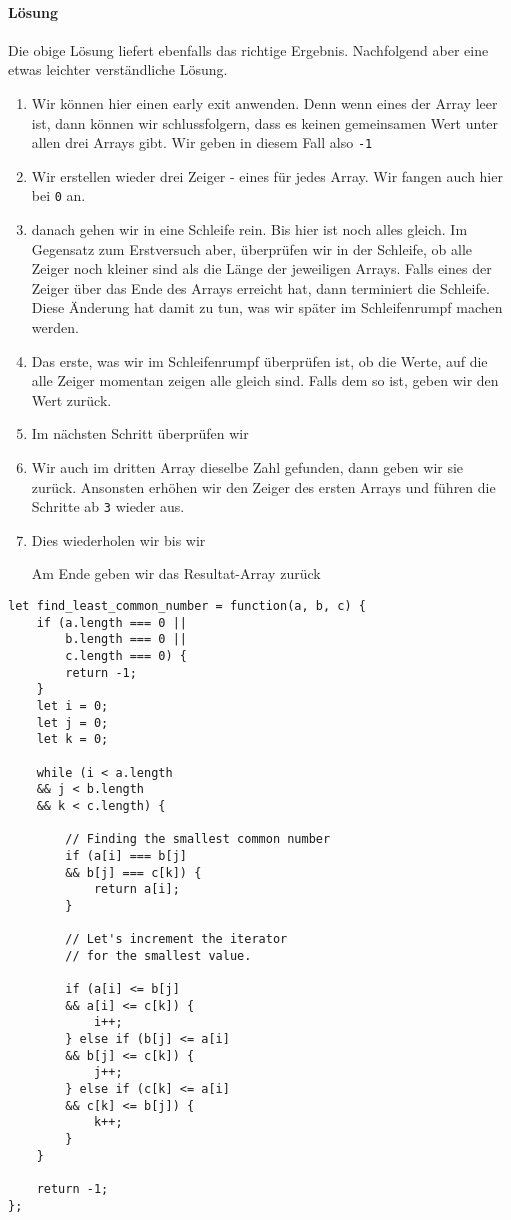 \documentclass[babel]{book}
\begin{document}
\paragraph{Lösung} Die obige Lösung liefert ebenfalls das richtige Ergebnis. Nachfolgend aber eine etwas leichter verständliche Lösung.
\begin{enumerate} 
	\item Wir können hier einen early exit anwenden. Denn wenn eines der Array leer ist, dann können wir schlussfolgern, dass es keinen gemeinsamen Wert unter allen drei Arrays gibt. Wir geben in diesem Fall also \lstinline|-1| 
	\item Wir erstellen wieder drei Zeiger - eines für jedes Array. Wir fangen auch hier bei \lstinline|0| an.
	\item danach gehen wir in eine Schleife rein. Bis hier ist noch alles gleich. Im Gegensatz zum Erstversuch aber, überprüfen wir in der Schleife, ob alle Zeiger noch kleiner sind als die Länge der jeweiligen Arrays. Falls eines der Zeiger über das Ende des Arrays erreicht hat, dann terminiert die Schleife. Diese Änderung hat damit zu tun, was wir später im Schleifenrumpf machen werden.
	\item Das erste, was wir im Schleifenrumpf überprüfen ist, ob die Werte, auf die alle Zeiger momentan zeigen alle gleich sind. Falls dem so ist, geben wir den Wert zurück. 
	\item Im nächsten Schritt überprüfen wir 
	\item Wir auch im dritten Array dieselbe Zahl gefunden, dann geben wir sie zurück. Ansonsten erhöhen wir den Zeiger des ersten Arrays und führen die Schritte ab \lstinline|3| wieder aus.
	\item Dies wiederholen wir bis wir 
	
	Am Ende geben wir das Resultat-Array zurück
\end{enumerate}

\begin{lstlisting}[caption=My Javascript Example]
let find_least_common_number = function(a, b, c) {
	if (a.length === 0 ||
		b.length === 0 ||
		c.length === 0) {
		return -1;
	}
	let i = 0;
	let j = 0;
	let k = 0;

	while (i < a.length
	&& j < b.length 
	&& k < c.length) {
	
		// Finding the smallest common number
		if (a[i] === b[j]
		&& b[j] === c[k]) {
			return a[i];
		}
		
		// Let's increment the iterator
		// for the smallest value.
		
		if (a[i] <= b[j]
		&& a[i] <= c[k]) {
			i++;
		} else if (b[j] <= a[i]
		&& b[j] <= c[k]) {
			j++;
		} else if (c[k] <= a[i]
		&& c[k] <= b[j]) {
			k++;
		}	
	}
	
	return -1;
};
\end{lstlisting}
\end{document}
